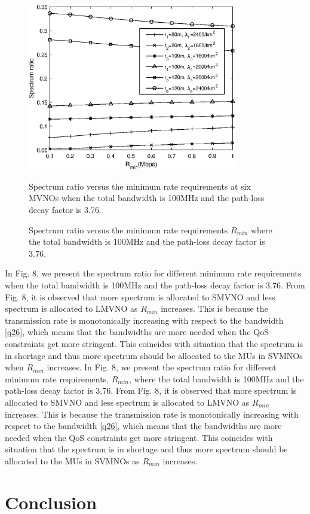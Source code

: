 \documentclass[journal]{IEEEtran}
\begin{document}
\begin{IEEEkeywords}
\begin{figure}
	\centering
	\includegraphics[width=3.6in]{SR_rmin.eps}
	\caption{Spectrum ratio versus the minimum rate requirements at six MVNOs when the total bandwidth is 100MHz and the path-loss decay factor is 3.76.}
	\caption{Spectrum ratio versus the minimum rate requirements $R_{min}$ where the total bandwidth is 100MHz and the path-loss decay factor is 3.76.}
\end{figure}

In Fig. 8, we present the spectrum ratio for different minimum rate requirements when the total bandwidth is 100MHz and the path-loss decay factor is 3.76. From Fig. 8, it is observed that more spectrum is allocated to SMVNO and less spectrum is allocated to LMVNO as $R_{min}$ increases. This is because the transmission rate is monotonically increasing with respect to the bandwidth \eqref{q26}, which means that the bandwidths are more needed when the QoS constraints get more stringent. This coincides with situation that the spectrum is in shortage and thus more spectrum should be allocated to the MUs in SVMNOs when $R_{min}$ increases.
In Fig. 8, we present the spectrum ratio for different minimum rate requirements, $R_{min}$, where the total bandwidth is 100MHz and the path-loss decay factor is 3.76. From Fig. 8, it is observed that more spectrum is allocated to SMVNO and less spectrum is allocated to LMVNO as $R_{min}$ increases. This is because the transmission rate is monotonically increasing with respect to the bandwidth \eqref{q26}, which means that the bandwidths are more needed when the QoS constraints get more stringent. This coincides with situation that the spectrum is in shortage and thus more spectrum should be allocated to the MUs in SVMNOs as $R_{min}$ increases.
\section{Conclusion}


\end{IEEEkeywords}
\end{document}
